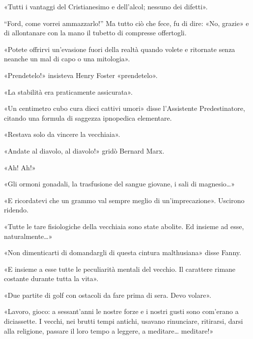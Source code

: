 \documentclass[
a5paper, %
10pt, %
twoside, 
onecolumn, %
openany, %
]{memoir}
\renewenvironment{shaded}{%
  \def\FrameCommand{\fboxsep=\FrameSep \colorbox{shadecolor}}%
  \MakeFramed{\advance\hsize-\width \FrameRestore\FrameRestore}}%
 {\endMakeFramed}
\begin{document}
«Tutti i vantaggi del Cristianesimo e dell’alcol; nessuno dei difetti».

\begin{shaded}
    “Ford, come vorrei ammazzarlo!” Ma tutto ciò che fece, fu di dire: «No, grazie» e di allontanare con la mano il tubetto di compresse offertogli.
\end{shaded}

«Potete offrirvi un’evasione fuori della realtà quando volete e ritornate senza neanche un mal di capo o una mitologia».

\begin{shaded}
    «Prendetelo!» insisteva Henry Foster «prendetelo».
\end{shaded}

«La stabilità era praticamente assicurata».

\begin{shaded}
    «Un centimetro cubo cura dieci cattivi umori» disse l’Assistente Predestinatore, citando una formula di saggezza ipnopedica elementare.
\end{shaded}

«Restava solo da vincere la vecchiaia».

\begin{shaded}
    «Andate al diavolo, al diavolo!» gridò Bernard Marx.

«Ah! Ah!»
\end{shaded}

«Gli ormoni gonadali, la trasfusione del sangue giovane, i sali di magnesio…»

\begin{shaded}
    «E ricordatevi che un grammo val sempre meglio di un’imprecazione». Uscirono ridendo.
\end{shaded}

«Tutte le tare fisiologiche della vecchiaia sono state abolite. Ed insieme ad esse, naturalmente…»

\begin{shaded}
    «Non dimenticarti di domandargli di questa cintura malthusiana» disse Fanny.
\end{shaded}

«E insieme a esse tutte le peculiarità mentali del vecchio. Il carattere rimane costante durante tutta la vita».

\begin{shaded}
    «Due partite di golf con ostacoli da fare prima di sera. Devo volare».
\end{shaded}

«Lavoro, gioco: a sessant’anni le nostre forze e i nostri gusti sono com’erano a diciassette. I vecchi, nei brutti tempi antichi, usavano rinunciare, ritirarsi, darsi alla religione, passare il loro tempo a leggere, a meditare… meditare!»
\end{document}

